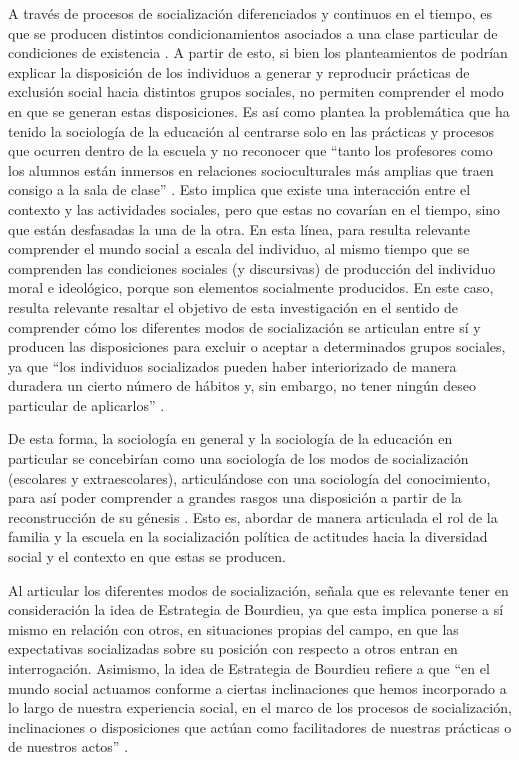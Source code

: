 \documentclass[12pt,twoside]{templates/facsothesis}
\begin{document}
A través de procesos de socialización diferenciados y continuos en el tiempo, es que se producen distintos condicionamientos asociados a una clase particular de condiciones de existencia \citep{bourdieu_sentido_2007}. A partir de esto, si bien los planteamientos de \citet{bourdieu_sentido_2007} podrían explicar la disposición de los individuos a generar y reproducir prácticas de exclusión social hacia distintos grupos sociales, no permiten comprender el modo en que se generan estas disposiciones. Es así como \citet{archer_teoria_2009} plantea la problemática que ha tenido la sociología de la educación al centrarse solo en las prácticas y procesos que ocurren dentro de la escuela y no reconocer que ``tanto los profesores como los alumnos están inmersos en relaciones socioculturales más amplias que traen consigo a la sala de clase'' \citep[p.~39]{archer_teoria_2009}. Esto implica que existe una interacción entre el contexto y las actividades sociales, pero que estas no covarían en el tiempo, sino que están desfasadas la una de la otra. En esta línea, para \citet{lahire_teoria_2012} resulta relevante comprender el mundo social a escala del individuo, al mismo tiempo que se comprenden las condiciones sociales (y discursivas) de producción del individuo moral e ideológico, porque son elementos socialmente producidos. En este caso, resulta relevante resaltar el objetivo de esta investigación en el sentido de comprender cómo los diferentes modos de socialización se articulan entre sí y producen las disposiciones para excluir o aceptar a determinados grupos sociales, ya que ``los individuos socializados pueden haber interiorizado de manera duradera un cierto número de hábitos y, sin embargo, no tener ningún deseo particular de aplicarlos'' \citep[p.~87]{lahire_teoria_2012}.

De esta forma, la sociología en general y la sociología de la educación en particular se concebirían como una sociología de los modos de socialización (escolares y extraescolares), articulándose con una sociología del conocimiento, para así poder comprender a grandes rasgos una disposición a partir de la reconstrucción de su génesis \citep{lahire_teoria_2012}. Esto es, abordar de manera articulada el rol de la familia y la escuela en la socialización política de actitudes hacia la diversidad social y el contexto en que estas se producen.

Al articular los diferentes modos de socialización, \citet{aedohenriquez_habitus_2015} señala que es relevante tener en consideración la idea de Estrategia de Bourdieu, ya que esta implica ponerse a sí mismo en relación con otros, en situaciones propias del campo, en que las expectativas socializadas sobre su posición con respecto a otros entran en interrogación. Asimismo, la idea de Estrategia de Bourdieu refiere a que ``en el mundo social actuamos conforme a ciertas inclinaciones que hemos incorporado a lo largo de nuestra experiencia social, en el marco de los procesos de socialización, inclinaciones o disposiciones que actúan como facilitadores de nuestras prácticas o de nuestros actos'' \citep[p.~280]{aguilar_habitus_2017}.
\end{document}
